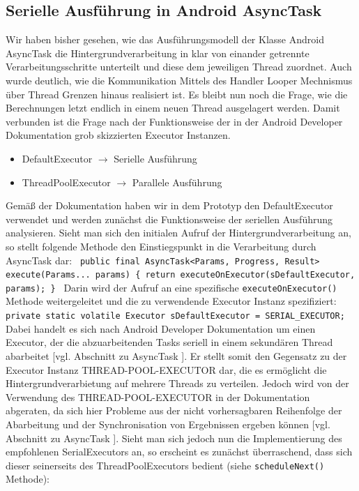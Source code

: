 \documentclass[12pt,oneside,a4paper,bibtotoc,liststotoc]{scrreprt}
\begin{document}
\subsection{Serielle Ausführung in Android AsyncTask}
Wir haben bisher gesehen, wie das Ausführungsmodell der Klasse Android AsyncTask die Hintergrundverarbeitung in klar von einander getrennte Verarbeitungsschritte unterteilt und diese dem jeweiligen Thread zuordnet. Auch wurde deutlich, wie die Kommunikation Mittels des Handler Looper Mechnismus über Thread Grenzen hinaus realisiert ist. Es bleibt nun noch die Frage, wie die Berechnungen letzt endlich in einem neuen Thread ausgelagert werden. Damit verbunden ist die Frage nach der Funktionsweise der in der Android Developer Dokumentation grob skizzierten Executor Instanzen.
\begin{itemize}
\item DefaultExecutor $\rightarrow$ Serielle Ausführung
\item ThreadPoolExecutor $\rightarrow$ Parallele Ausführung
\end{itemize}
Gemäß der Dokumentation haben wir in dem Prototyp den DefaultExecutor verwendet und werden zunächst die Funktionsweise der seriellen Ausführung analysieren. Sieht man sich den initialen Aufruf der Hintergrundverarbeitung an, so stellt folgende Methode den Einstiegspunkt in die Verarbeitung durch AsyncTask dar:\newline
\texttt{\newline
public final AsyncTask<Params, Progress, Result> execute(Params... params) \{\newline
    return executeOnExecutor(sDefaultExecutor, params);\newline
\}\newline
}\newline
Darin wird der Aufruf an eine spezifische \texttt{executeOnExecutor()} Methode weitergeleitet und die zu verwendende Executor Instanz spezifiziert:\newline
\texttt{\newline
private static volatile Executor sDefaultExecutor = SERIAL\_EXECUTOR;\newline
}\newline
Dabei handelt es sich nach Android Developer Dokumentation um einen Executor, der die abzuarbeitenden Tasks seriell in einem sekundären Thread abarbeitet  [vgl. Abschnitt zu AsyncTask \citet{androidDevDocu}]. Er stellt somit den Gegensatz zu der Executor Instanz THREAD-POOL-EXECUTOR dar, die es ermöglicht die Hintergrundverarbietung auf mehrere Threads zu verteilen. Jedoch wird von der Verwendung des THREAD-POOL-EXECUTOR in der Dokumentation abgeraten, da sich hier Probleme aus der nicht vorhersagbaren Reihenfolge der Abarbeitung und der Synchronisation von Ergebnissen ergeben können [vgl. Abschnitt zu AsyncTask \citet{androidDevDocu}]. Sieht man sich jedoch nun die Implementierung des empfohlenen SerialExecutors an, so erscheint es zunächst überraschend, dass sich dieser seinerseits des ThreadPoolExecutors bedient (siehe \texttt{scheduleNext()} Methode):\newline
\end{document}
